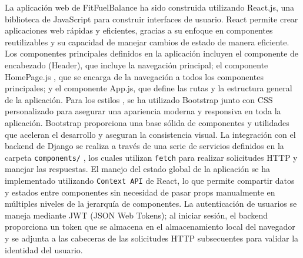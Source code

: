 La aplicación web de FitFuelBalance  ha sido construida utilizando React.js, una biblioteca de JavaScript para construir interfaces de usuario. React permite crear aplicaciones web rápidas y eficientes, gracias a su enfoque en componentes reutilizables y su capacidad de manejar cambios de estado de manera eficiente. Los componentes principales definidos en la aplicación incluyen el componente de encabezado (Header), que incluye la navegación principal; el componente HomePage.js , que se encarga de la navegación a todos los componentes principales; y el componente App.js, que define las rutas y la estructura general de la aplicación. Para los estilos , se ha utilizado Bootstrap junto con CSS personalizado para asegurar una apariencia moderna y responsiva en toda la aplicación. Bootstrap proporciona una base sólida de componentes y utilidades que aceleran el desarrollo y aseguran la consistencia visual. La integración con el backend de Django se realiza a través de una serie de servicios definidos en la carpeta \texttt{components/} , los cuales utilizan \texttt{fetch}  para realizar solicitudes HTTP y manejar las respuestas. El manejo del estado global de la aplicación se ha implementado utilizando \texttt{Context API} de React, lo que permite compartir datos y estados entre componentes sin necesidad de pasar props manualmente en múltiples niveles de la jerarquía de componentes. La autenticación de usuarios se maneja mediante JWT (JSON Web Tokens); al iniciar sesión, el backend proporciona un token que se almacena en el almacenamiento local del navegador y se adjunta a las cabeceras de las solicitudes HTTP subsecuentes para validar la identidad del usuario.